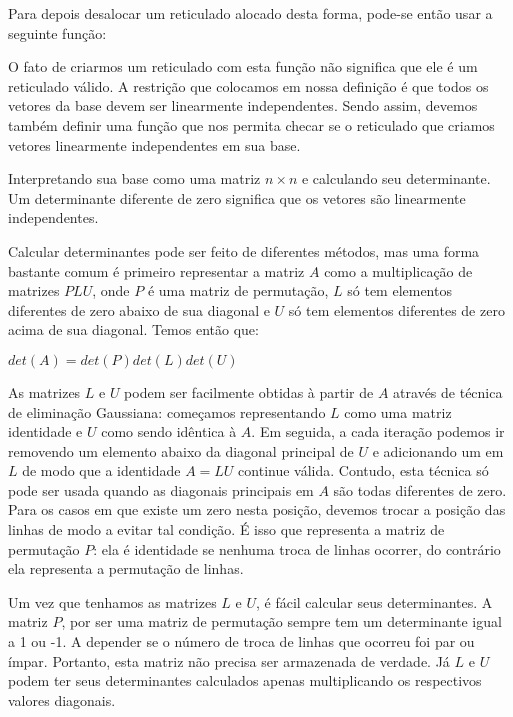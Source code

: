 Para depois desalocar um reticulado alocado desta forma, pode-se então
usar a seguinte função:


O fato de criarmos um reticulado com esta função não significa que ele
é um reticulado válido. A restrição que colocamos em nossa definição é
que todos os vetores da base devem ser linearmente
independentes. Sendo assim, devemos também definir uma função que nos
permita checar se o reticulado que criamos vetores linearmente
independentes em sua base.


 Interpretando sua base como uma matriz $n\times n$
e calculando seu determinante. Um determinante diferente de zero
significa que os vetores são linearmente independentes.

Calcular determinantes pode ser feito de diferentes métodos, mas uma
forma bastante comum é primeiro representar a matriz $A$ como a
multiplicação de matrizes $PLU$, onde $P$ é uma matriz de permutação,
$L$ só tem elementos diferentes de zero abaixo de sua diagonal e $U$
só tem elementos diferentes de zero acima de sua diagonal. Temos então
que:

$det(A) = det(P)det(L)det(U)$

As matrizes $L$ e $U$ podem ser facilmente obtidas à partir de $A$
através de técnica de eliminação Gaussiana: começamos representando
$L$ como uma matriz identidade e $U$ como sendo idêntica à $A$. Em
seguida, a cada iteração podemos ir removendo um elemento abaixo da
diagonal principal de $U$ e adicionando um em $L$ de modo que a
identidade $A=LU$ continue válida. Contudo, esta técnica só pode ser
usada quando as diagonais principais em $A$ são todas diferentes de
zero. Para os casos em que existe um zero nesta posição, devemos
trocar a posição das linhas de modo a evitar tal condição. É isso que
representa a matriz de permutação $P$: ela é identidade se nenhuma
troca de linhas ocorrer, do contrário ela representa a permutação de
linhas.

Um vez que tenhamos as matrizes $L$ e $U$, é fácil calcular seus
determinantes. A matriz $P$, por ser uma matriz de permutação sempre
tem um determinante igual a 1 ou -1. A depender se o número de troca
de linhas que ocorreu foi par ou ímpar. Portanto, esta matriz não
precisa ser armazenada de verdade. Já $L$ e $U$ podem ter seus
determinantes calculados apenas multiplicando os respectivos valores
diagonais.

